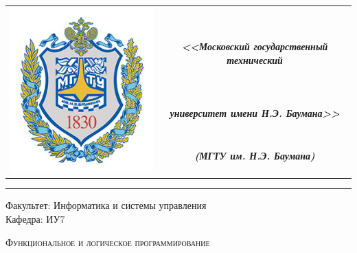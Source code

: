 \begin{titlepage}

    \begin{table}[H]
        \centering
        \begin{tabular}{cc}
            \multirow{4}{*}{\includegraphics[scale=0.3]{../bmstu.jpg}}
            & \\
            & \large \textit{\textbf{<<Московский государственный технический}} \\
            & \large \textit{\textbf{университет имени Н.Э. Баумана>>}}\\
            & \large \textit{\textbf{(МГТУ им. Н.Э. Баумана)}}\\
        \end{tabular}
    \end{table}

    \begin{flushleft}
        \rule{\textwidth}{3pt}
    \end{flushleft}

    \begin{flushleft}
        \Large
        Факультет: Информатика и системы управления \\
        Кафедра: ИУ7
    \end{flushleft}

    \vspace{2cm}

    \begin{center}
        \LARGE
        \textsc{Функциональное и логическое программирование}
    \end{center}

    \vspace{3cm}

    \begin{center}
        \large


\end{center}
\end{titlepage}
